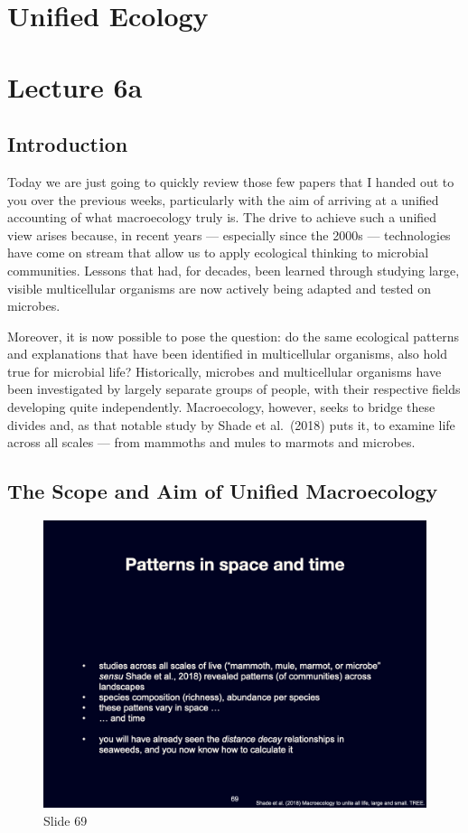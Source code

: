 \documentclass[
  12pt,
]{book}
\begin{document}
\chapter{Unified Ecology}\label{unified-ecology}

\chapter*{Lecture 6a}\label{lecture-6a}

\section{Introduction}\label{introduction-2}

Today we are just going to quickly review those few papers that I handed
out to you over the previous weeks, particularly with the aim of
arriving at a unified accounting of what macroecology truly is. The
drive to achieve such a unified view arises because, in recent years ---
especially since the 2000s --- technologies have come on stream that
allow us to apply ecological thinking to microbial communities. Lessons
that had, for decades, been learned through studying large, visible
multicellular organisms are now actively being adapted and tested on
microbes.

Moreover, it is now possible to pose the question: do the same
ecological patterns and explanations that have been identified in
multicellular organisms, also hold true for microbial life?
Historically, microbes and multicellular organisms have been
investigated by largely separate groups of people, with their respective
fields developing quite independently. Macroecology, however, seeks to
bridge these divides and, as that notable study by Shade et al.~(2018)
puts it, to examine life across all scales --- from mammoths and mules
to marmots and microbes.

\section{The Scope and Aim of Unified
Macroecology}\label{the-scope-and-aim-of-unified-macroecology}

\begin{figure}[ht]
\centering
\includegraphics[width=0.8\linewidth]{../images/BDC334/BDC334-069.jpeg}
\caption*{Slide 69}
\end{figure}
\end{document}
